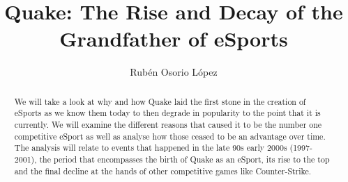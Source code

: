 \documentclass[twocolumn]{article}
\title{Quake: The Rise and Decay of the Grandfather of eSports}
\author{Rubén Osorio López}
\newcommand{\citep}[1]{\parencite{#1}}
\begin{document}
\maketitle

\begin{abstract}

We will take a look at why and how Quake laid the first stone in the creation of eSports as we know them today to then degrade in popularity to the point that it is currently. We will examine the different reasons that caused it to be the number one competitive eSport as well as analyse how those ceased to be an advantage over time. The analysis will relate to events that happened in the late 90s early 2000s (1997-2001), the period that encompasses the birth of Quake as an eSport, its rise to the top and the final decline at the hands of other competitive games like Counter-Strike.

\end{abstract}







\nocite{*} %


\printbibliography[title={Bibliography},nottype=software] 
\printbibliography[title={Videogames},type=software]

\end{document}
